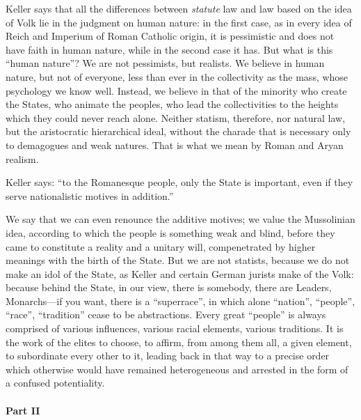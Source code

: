 Keller says that all the differences between \emph{statute} law and law based on the idea of Volk lie in the judgment on human nature: in the first case, as in every idea of Reich and Imperium of Roman Catholic origin, it is pessimistic and does not have faith in human nature, while in the second case it has. But what is this ``human nature''? We are not pessimists, but realists. We believe in human nature, but not of everyone, less than ever in the collectivity as the mass, whose psychology we know well. Instead, we believe in that of the minority who create the States, who animate the peoples, who lead the collectivities to the heights which they could never reach alone. Neither statism, therefore, nor natural law, but the aristocratic hierarchical ideal, without the charade that is necessary only to demagogues and weak natures. That is what we mean by Roman and Aryan realism.

Keller says: ``to the Romanesque people, only the State is important, even if they serve nationalistic motives in addition.''

We say that we can even renounce the additive motives; we value the Mussolinian idea, according to which the people is something weak and blind, before they came to constitute a reality and a unitary will, compenetrated by higher meanings with the birth of the State. But we are not statists, because we do not make an idol of the State, as Keller and certain German jurists make of the Volk: because behind the State, in our view, there is somebody, there are Leaders, Monarchs---if you want, there is a ``superrace'', in which alone ``nation'', ``people'', ``race'', ``tradition'' cease to be abstractions. Every great ``people'' is always comprised of various influences, various racial elements, various traditions. It is the work of the elites to choose, to affirm, from among them all, a given element, to subordinate every other to it, leading back in that way to a precise order which otherwise would have remained heterogeneous and arrested in the form of a confused potentiality.

\paragraph{Part II} 


